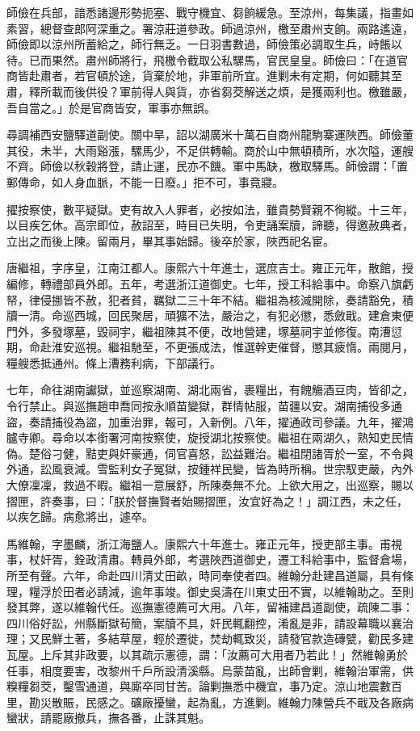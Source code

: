 \begin{pinyinscope}
師儉在兵部，諳悉諸邊形勢扼塞、戰守機宜、芻餉緩急。至涼州，每集議，指畫如素習，總督查郎阿深重之。署涼莊道參政。師過涼州，檄至肅州支餉。兩路遙遠，師儉即以涼州所蓄給之，師行無乏。一日羽書數過，師儉策必調取生兵，峙餦以待。已而果然。肅州師將行，飛檄令截取公私騾馬，官民皇皇。師儉曰：「在道官商皆赴肅者，若官頓於途，貨棄於地，非軍前所宜。進剿未有定期，何如聽其至肅，釋所載而後供役？軍前得人與貨，亦省芻茭解送之煩，是獲兩利也。檄雖嚴，吾自當之。」於是官商皆安，軍事亦無誤。

尋調補西安鹽驛道副使。關中旱，詔以湖廣米十萬石自商州龍駒寨運陜西。師儉董其役，未半，大雨谿漲，騾馬少，不足供轉輸。商於山中無頓積所，水次隘，運艘不齊。師儉以秋穀將登，請止運，民亦不饑。軍中馬缺，檄取驛馬。師儉謂：「置郵傳命，如人身血脈，不能一日廢。」拒不可，事竟寢。

擢按察使，數平疑獄。吏有故入人罪者，必按如法，雖貴勢賢親不徇縱。十三年，以目疾乞休。高宗即位，赦詔至，時目已失明，令吏誦案牘，諦聽，得邀赦典者，立出之而後上陳。留兩月，畢其事始歸。後卒於家，陜西祀名宦。

唐繼祖，字序皇，江南江都人。康熙六十年進士，選庶吉士。雍正元年，散館，授編修，轉禮部員外郎。五年，考選浙江道御史。七年，授工科給事中。命察八旗虧帑，律侵挪皆不赦，犯者貧，羈獄二三十年不結。繼祖為核減開除，奏請豁免，積牘一清。命巡西城，回民聚居，頑獷不法，嚴治之，有犯必懲，悉斂戢。建倉東便門外，多發塚墓，毀祠宇，繼祖陳其不便，改地營建，塚墓祠宇並修復。南漕愆期，命赴淮安巡視。繼祖馳至，不更張成法，惟選幹吏催督，懲其疲惰。兩閱月，糧艘悉抵通州。條上漕務利病，下部議行。

七年，命往湖南讞獄，並巡察湖南、湖北兩省，裹糧出，有餽觴酒豆肉，皆卻之，令行禁止。與巡撫趙申喬同按永順苗變獄，群情帖服，苗疆以安。湖南捕役多通盜，奏請捕役為盜，加重治罪，報可，入新例。八年，擢通政司參議。九年，擢鴻臚寺卿。尋命以本銜署河南按察使，旋授湖北按察使。繼祖在兩湖久，熟知吏民情偽。楚俗刁健，黠吏與奸豪通，伺官喜怒，訟益難治。繼祖閉諸胥於一室，不令與外通，訟風衰減。雪監利女子冤獄，按鍾祥民變，皆為時所稱。世宗馭吏嚴，內外大僚凜凜，救過不暇。繼祖一意展舒，所陳奏無不允。上欲大用之，出巡察，賜以摺匣，許奏事，曰：「朕於督撫賢者始賜摺匣，汝宜好為之！」調江西，未之任，以疾乞歸。病愈將出，遽卒。

馬維翰，字墨麟，浙江海鹽人。康熙六十年進士。雍正元年，授吏部主事。甫視事，杖奸胥，銓政清肅。轉員外郎，考選陜西道御史，遷工科給事中，監督倉場，所至有聲。六年，命赴四川清丈田畝，時同奉使者四。維翰分赴建昌道屬，具有條理，糧浮於田者必請減，逾年事竣。御史吳濤在川東丈田不實，以維翰助之。至則發其弊，遂以維翰代任。巡撫憲德薦可大用。八年，留補建昌道副使，疏陳二事：四川俗好訟，州縣斷獄茍簡，案牘不具，奸民輒翻控，淆亂是非，請設幕職以襄治理；又民鮮土著，多結草屋，輕於遷徙，焚劫輒致災，請發官款造磚甓，勸民多建瓦屋。上斥其非政要，以其疏示憲德，謂：「汝薦可大用者乃若此！」然維翰勇於任事，相度要害，改黎州千戶所設清溪縣。烏蒙苗亂，出師會剿，維翰治軍需，供糗糧芻茭，鑿雪通道，與廝卒同甘苦。論剿撫悉中機宜，事乃定。涼山地震數百里，勘災散賑，民感之。礦廠擾蠻，起為亂，方進剿。維翰力陳營兵不戢及各廠病蠻狀，請罷廠撤兵，撫各番，止誅其魁。


\end{pinyinscope}
